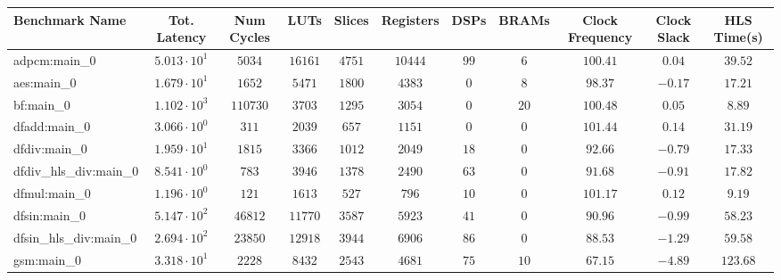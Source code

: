 \begin{tabular}{|l|c|c|c|c|c|c|c|c|c|c|}
\hline
Benchmark Name          & Tot. Latency           & Num Cycles & LUTs      & Slices    & Registers & DSPs    & BRAMs   & Clock Frequency & Clock Slack & HLS Time(s) \\
\hline
adpcm:main\_0           & $ 5.013 \cdot 10^{1} $ & $ 5034   $ & $ 16161 $ & $ 4751  $ & $ 10444 $ & $ 99  $ & $ 6   $ & $ 100.41      $ & $ 0.04    $ & $ 39.52   $ \\
aes:main\_0             & $ 1.679 \cdot 10^{1} $ & $ 1652   $ & $ 5471  $ & $ 1800  $ & $ 4383  $ & $ 0   $ & $ 8   $ & $ 98.37       $ & $ -0.17   $ & $ 17.21   $ \\
bf:main\_0              & $ 1.102 \cdot 10^{3} $ & $ 110730 $ & $ 3703  $ & $ 1295  $ & $ 3054  $ & $ 0   $ & $ 20  $ & $ 100.48      $ & $ 0.05    $ & $ 8.89    $ \\
dfadd:main\_0           & $ 3.066 \cdot 10^{0} $ & $ 311    $ & $ 2039  $ & $ 657   $ & $ 1151  $ & $ 0   $ & $ 0   $ & $ 101.44      $ & $ 0.14    $ & $ 31.19   $ \\
dfdiv:main\_0           & $ 1.959 \cdot 10^{1} $ & $ 1815   $ & $ 3366  $ & $ 1012  $ & $ 2049  $ & $ 18  $ & $ 0   $ & $ 92.66       $ & $ -0.79   $ & $ 17.33   $ \\
dfdiv\_hls\_div:main\_0 & $ 8.541 \cdot 10^{0} $ & $ 783    $ & $ 3946  $ & $ 1378  $ & $ 2490  $ & $ 63  $ & $ 0   $ & $ 91.68       $ & $ -0.91   $ & $ 17.82   $ \\
dfmul:main\_0           & $ 1.196 \cdot 10^{0} $ & $ 121    $ & $ 1613  $ & $ 527   $ & $ 796   $ & $ 10  $ & $ 0   $ & $ 101.17      $ & $ 0.12    $ & $ 9.19    $ \\
dfsin:main\_0           & $ 5.147 \cdot 10^{2} $ & $ 46812  $ & $ 11770 $ & $ 3587  $ & $ 5923  $ & $ 41  $ & $ 0   $ & $ 90.96       $ & $ -0.99   $ & $ 58.23   $ \\
dfsin\_hls\_div:main\_0 & $ 2.694 \cdot 10^{2} $ & $ 23850  $ & $ 12918 $ & $ 3944  $ & $ 6906  $ & $ 86  $ & $ 0   $ & $ 88.53       $ & $ -1.29   $ & $ 59.58   $ \\
gsm:main\_0             & $ 3.318 \cdot 10^{1} $ & $ 2228   $ & $ 8432  $ & $ 2543  $ & $ 4681  $ & $ 75  $ & $ 10  $ & $ 67.15       $ & $ -4.89   $ & $ 123.68  $ \\

\end{tabular}
